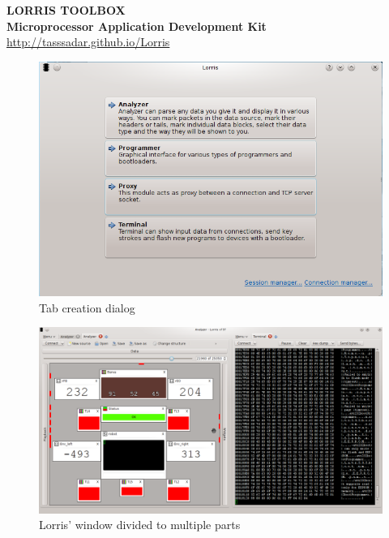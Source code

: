 \documentclass[12pt, a4paper, oneside]{article}
\newcommand{\B}{\textbf} %
\begin{document}
\setlength{\voffset}{-20mm}
\begin{center}

\Large
\B{LORRIS TOOLBOX} \\
\large
\B{Microprocessor Application Development Kit}
\url{http://tasssadar.github.io/Lorris}

\end{center}

\begin{figure}[H]
\begin{center}
\includegraphics[scale=0.6]{../img/new_tab.png}
\caption{Tab creation dialog}
\end{center}
\end{figure}

\begin{figure}[H]
\begin{center}
\includegraphics[width=\textwidth]{../img/split.png}
\caption{Lorris' window divided to multiple parts}
\end{center}
\end{figure}
\end{document}
